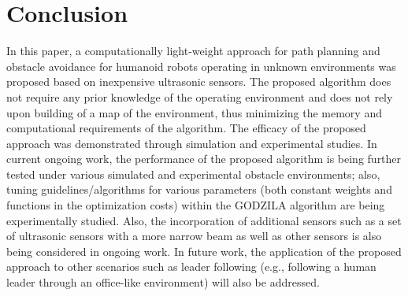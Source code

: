 \documentclass[10pt,conference]{ieeeconf}
\begin{document}
    \vspace*{-0.03in}
\section{Conclusion}
    \vspace*{-0.03in}
In this paper, a computationally light-weight approach for path planning and
obstacle avoidance for humanoid robots operating in unknown environments was
proposed based on inexpensive ultrasonic sensors. The proposed algorithm does
not require any prior knowledge of the operating environment and does not rely
upon building of a map of the environment, thus minimizing the memory and
computational requirements of the algorithm. The efficacy of the proposed
approach was demonstrated through simulation and experimental studies. 
In current ongoing work, the performance of the proposed algorithm is being
further tested under various simulated and experimental obstacle environments; also, tuning guidelines/algorithms for various parameters (both constant weights and
functions in the optimization costs) within the GODZILA algorithm are being
experimentally studied.
Also, the incorporation of additional sensors such as a set of ultrasonic
sensors with a more narrow beam as well as other sensors is also being considered in ongoing work. 
In future work, the application of the proposed approach to other scenarios
such as leader following (e.g., following a human leader through an office-like
environment) will also be addressed.

      
\end{document}
